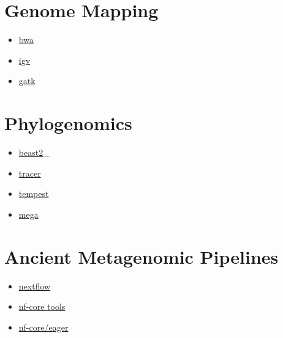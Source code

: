 \documentclass[
  letterpaper,
]{book}
\providecommand{\tightlist}{%
  \setlength{\itemsep}{0pt}\setlength{\parskip}{0pt}}\usepackage{longtable,booktabs,array}
\begin{document}
\hypertarget{genome-mapping-2}{%
\section{Genome Mapping}\label{genome-mapping-2}}

\begin{itemize}
\tightlist
\item
  \href{http://bio-bwa.sourceforge.net/}{bwa}
\item
  \href{https://igv.org/}{igv}
\item
  \href{https://gatk.broadinstitute.org/hc/en-us}{gatk}
\end{itemize}

\hypertarget{phylogenomics-1}{%
\section{Phylogenomics}\label{phylogenomics-1}}

\begin{itemize}
\tightlist
\item
  \href{https://www.beast2.org/}{beast2}\_
\item
  \href{http://tree.bio.ed.ac.uk/software/tracer/}{tracer}
\item
  \href{https://beast.community/tempest}{tempest}
\item
  \href{https://www.megasoftware.net/}{mega}
\end{itemize}

\hypertarget{ancient-metagenomic-pipelines-2}{%
\section{Ancient Metagenomic
Pipelines}\label{ancient-metagenomic-pipelines-2}}

\begin{itemize}
\tightlist
\item
  \href{https://www.nextflow.io/}{nextflow}
\item
  \href{https://nf-co.re/tools}{nf-core tools}
\item
  \href{https://nf-co.re/eager}{nf-core/eager}
\end{itemize}


\backmatter

\printindex
\end{document}
